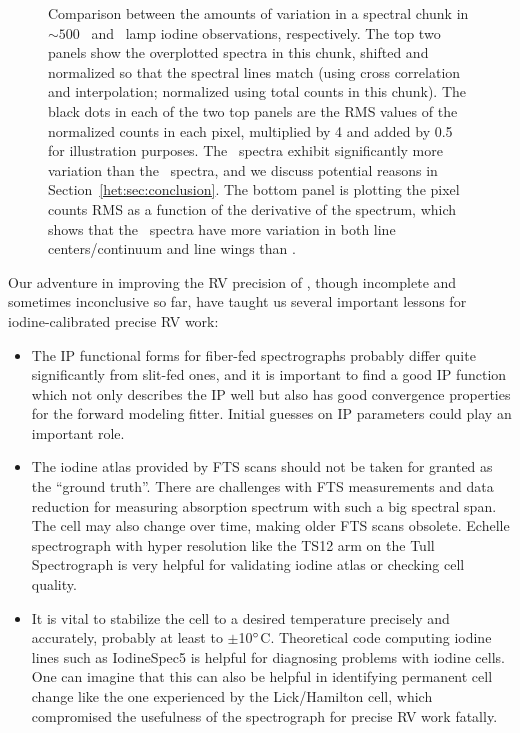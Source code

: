 \begin{figure}
\caption{Comparison between the amounts of variation in a spectral
chunk in $\sim 500$ \het\ and \keck\ lamp iodine observations,
respectively. The top two panels show the overplotted spectra in this
chunk, shifted and normalized so that the spectral lines match (using
cross correlation and interpolation; normalized using total counts in
this chunk). The black dots in each of the two top panels are the RMS
values of the normalized counts in each pixel, multiplied by 4 and
added by 0.5 for illustration purposes. The \het\ spectra exhibit
significantly more variation than the \keck\ spectra, and we discuss
potential reasons in Section~\ref{het:sec:conclusion}. The bottom
panel is plotting the pixel counts RMS as a function of the derivative
of the spectrum, which shows that the \het\ spectra have more
variation in both line centers/continuum and line wings than \keck.
\label{het:fig:chunkvary}}
\end{figure}

Our adventure in improving the RV precision of \het, though incomplete
and sometimes inconclusive so far, have taught us several important
lessons for iodine-calibrated precise RV work:

\begin{itemize}
  \item The IP functional forms for fiber-fed spectrographs probably
differ quite significantly from slit-fed ones, and it is important to
find a good IP function which not only describes the IP well but also
has good convergence properties for the forward modeling
fitter. Initial guesses on IP parameters could play an important role.
  \item The iodine atlas provided by FTS scans should not be taken for
granted as the ``ground truth''. There are challenges with FTS
measurements and data reduction for measuring absorption spectrum with
such a big spectral span. The cell may also change over time, making
older FTS scans obsolete. Echelle spectrograph with hyper resolution like the
TS12 arm on the Tull Spectrograph is very helpful for validating
iodine atlas or checking cell quality.
  \item It is vital to stabilize the cell to a desired temperature
precisely and accurately, probably at least to
$\pm$10$^{\circ}$C. Theoretical code computing iodine lines such as
IodineSpec5 is helpful for diagnosing problems with iodine cells. One
can imagine that this can also be helpful in identifying permanent
cell change like the one experienced by the Lick/Hamilton cell, which
compromised the usefulness of the spectrograph for precise RV work
fatally\citep{2014ApJS..210....5F}.
\end{itemize}


